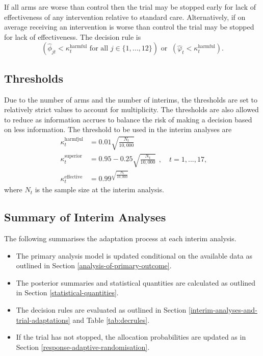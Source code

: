 \documentclass[
  bibliography=totoc]{scrreprt}
\providecommand{\tightlist}{%
  \setlength{\itemsep}{0pt}\setlength{\parskip}{0pt}}
\begin{document}
If all arms are worse than control then the trial may be stopped early for lack of effectiveness of any intervention relative to standard care.
Alternatively, if on average receiving an intervention is worse than control the trial may be stopped for lack of effectiveness.
The decision rule is
\[
\left(\hat\phi_{jt}<\kappa_t^{\text{harmful}}\text{ for all }j\in\{1,...,12\}\right)\text{ or }\ \left(\hat\varphi_t<\kappa_t^{\text{harmful}}\right).
\]

\hypertarget{thresholds}{%
\subsection{Thresholds}\label{thresholds}}

Due to the number of arms and the number of interims, the thresholds are set to relatively strict values to account for multiplicity.
The thresholds are also allowed to reduce as information accrues to balance the risk of making a decision based on less information.
The threshold to be used in the interim analyses are
\[
\begin{aligned}
\kappa_t^{\text{harmfjul}} &= 0.01{\sqrt{\frac{N_t}{{10,000}}}} \\
\kappa_t^{\text{superior}} &= 0.95 - 0.25\sqrt{\frac{N_t}{10,000}} \\
\kappa_t^{\text{effective}} &= 0.99^{\sqrt{\frac{N_t}{{10,000}}}}
\end{aligned},\quad t = 1,...,17,
\]
where \(N_t\) is the sample size at the interim analysis.

\hypertarget{summary-of-interim-analyses}{%
\subsection{Summary of Interim Analyses}\label{summary-of-interim-analyses}}

The following summarises the adaptation process at each interim analysis.

\begin{itemize}
\tightlist
\item
  The primary analysis model is updated conditional on the available data as outlined in Section \ref{analysis-of-primary-outcome}.
\item
  The posterior summaries and statistical quantities are calculated as outlined in Section \ref{statistical-quantities}.
\item
  The decision rules are evaluated as outlined in Section \ref{interim-analyses-and-trial-adaptations} and Table \ref{tab:decrules}.
\item
  If the trial has not stopped, the allocation probabilities are updated as in Section \ref{response-adaptive-randomisation}.
\end{itemize}
\end{document}
